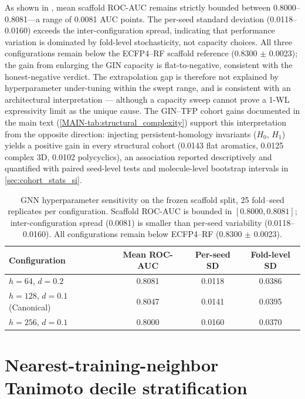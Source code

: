 \documentclass[11pt,a4paper]{article}
\begin{document}
As shown in , mean scaffold ROC-AUC remains strictly bounded between \numrange{0.8000}{0.8081}---a range of \num{0.0081} AUC points. The per-seed standard deviation (\numrange{0.0118}{0.0160}) exceeds the inter-configuration spread, indicating that performance variation is dominated by fold-level stochasticity, not capacity choices. All three configurations remain below the ECFP4--RF scaffold reference (\num{0.8300} $\pm$ \num{0.0023}); the gain from enlarging the GIN capacity is flat-to-negative, consistent with the honest-negative verdict. The extrapolation gap is therefore not explained by hyperparameter under-tuning within the swept range, and is consistent with an architectural interpretation --- although a capacity sweep cannot prove a 1-WL expressivity limit as the unique cause. The GIN--TFP cohort gains documented in the main text (\cref{MAIN-tab:structural_complexity}) support this interpretation from the opposite direction: injecting persistent-homology invariants ($H_0$, $H_1$) yields a positive gain in every structural cohort (\num{+0.0143} flat aromatics, \num{+0.0125} complex 3D, \num{+0.0102} polycyclics), an association reported descriptively and quantified with paired seed-level tests and molecule-level bootstrap intervals in \cref{sec:cohort_stats_si}.

\begin{table}[ht!]
\centering
\caption{GNN hyperparameter sensitivity on the frozen scaffold split, \num{25} fold--seed replicates per configuration. Scaffold ROC-AUC is bounded in $[\num{0.8000}, \num{0.8081}]$; inter-configuration spread (\num{0.0081}) is smaller than per-seed variability (\numrange{0.0118}{0.0160}). All configurations remain below ECFP4--RF (\num{0.8300} $\pm$ \num{0.0023}).}
\label{tab:s3_gnn_sensitivity}
\begin{tabular}{lccc}
\toprule
Configuration & Mean ROC-AUC & Per-seed SD & Fold-level SD \\
\midrule
$h=\num{64}$, $d=\num{0.2}$ & \num{0.8081} & \num{0.0118} & \num{0.0386} \\
$h=\num{128}$, $d=\num{0.1}$ (Canonical) & \num{0.8047} & \num{0.0141} & \num{0.0395} \\
$h=\num{256}$, $d=\num{0.1}$ & \num{0.8000} & \num{0.0160} & \num{0.0370} \\
\bottomrule
\end{tabular}
\end{table}

\section{Nearest-training-neighbor Tanimoto decile stratification}
\label{sec:nn_deciles_si}
\end{document}
